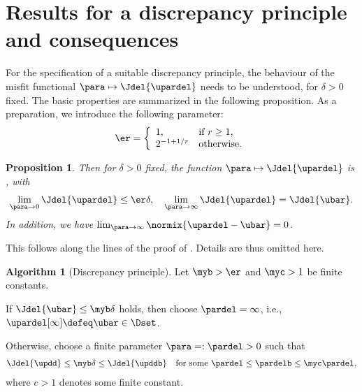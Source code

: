 \documentclass[10pt]{article}
\newtheorem{proposition}[theorem]{Proposition}
\theoremstyle{definition}
\newtheorem{algorithm}[theorem]{Algorithm}
\begin{document}
\section{Results for a discrepancy principle and consequences}
\label{sec:discrepancy_principle}
%
%
%
%
%
For the specification of a suitable discrepancy principle,
the behaviour of the misfit functional $ \para \mapsto \Jdel{\upardel} $ needs to be understood, for $ \delta > 0 $ fixed.
The basic properties are summarized in the following proposition.
As a preparation, we introduce the following parameter:
%
\begin{align}
\er = \left\{\begin{array}{ll} 1,
& \textup{if } r \ge 1, \\
2^{-1+1/r}& \textup{otherwise}.
\end{array}\right.
\label{eq:er}
\end{align}
%
\begin{proposition}
\label{th:misfit-behavior}
\mainassump
Then for $ \delta > 0 $ fixed, the function \linebreak $ \para \mapsto \Jdel{\upardel} $ is \monotonically \nondecreasing, with
%
\begin{align*}
\lim_{\para \to 0}  \Jdel{\upardel} \le \er \delta,
\quad \lim_{\para \to \infty}  \Jdel{\upardel} =  \Jdel{\ubar}.
\end{align*}
%
In addition, we have $ \lim_{\para \to \infty} \normix{\upardel - \ubar} = 0 $.
\end{proposition}
%
\proof This follows along the lines of the proof of \cite[Proposition 4.5]{HofPla20}.
Details are thus omitted here.
\proofend
%
%
\begin{algorithm}[Discrepancy principle]
\label{th:discrepancy-def}
Let $ \myb > \er $ and $ \myc > 1 $ be finite constants.
\begin{myenumerate}
\item
If $ \Jdel{\ubar} \le \myb \delta $ holds,
then choose $ \pardel = \infty $, i.e., $ \upardel[\infty] \defeq \ubar \in \Dset $.

\item
Otherwise, choose a finite parameter $ \para =: \pardel > 0 $ such that
%
\begin{align}
\Jdel{\updd} \le \myb \delta \le \Jdel{\upddb}
\quad \textup{for some } \pardel \le \pardelb \le \myc \pardel,
\label{eq:parameter-choice}
\end{align}
where $ c > 1 $ denotes some finite constant.
\end{myenumerate}
\end{algorithm}%
\end{document}
